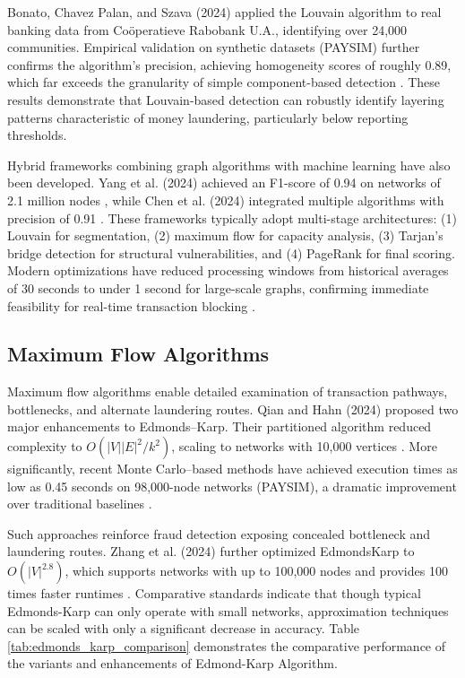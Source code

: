 \documentclass[lettersize,journal]{IEEEtran}
\begin{document}
Bonato, Chavez Palan, and Szava (2024) applied the Louvain algorithm to real banking data from Coöperatieve Rabobank U.A., identifying over 24,000 communities. Empirical validation on synthetic datasets (PAYSIM) further confirms the algorithm's precision, achieving homogeneity scores of roughly 0.89, which far exceeds the granularity of simple component-based detection \cite{bonato2024aml}. These results demonstrate that Louvain-based detection can robustly identify layering patterns characteristic of money laundering, particularly below reporting thresholds.

Hybrid frameworks combining graph algorithms with machine learning have also been developed. Yang et al. (2024) achieved an F1-score of 0.94 on networks of 2.1 million nodes \cite{yang2024gnn}, while Chen et al. (2024) integrated multiple algorithms with precision of 0.91 \cite{chen2024hybrid}. These frameworks typically adopt multi-stage architectures: (1) Louvain for segmentation, (2) maximum flow for capacity analysis, (3) Tarjan’s bridge detection for structural vulnerabilities, and (4) PageRank for final scoring. Modern optimizations have reduced processing windows from historical averages of 30 seconds to under 1 second for large-scale graphs, confirming immediate feasibility for real-time transaction blocking \cite{yang2024gnn,chen2024hybrid}.

\subsection{Maximum Flow Algorithms}

Maximum flow algorithms enable detailed examination of transaction pathways, bottlenecks, and alternate laundering routes. Qian and Hahn (2024) proposed two major enhancements to Edmonds–Karp. Their partitioned algorithm reduced complexity to $O(|V||E|^2/k^2)$, scaling to networks with 10,000 vertices \cite{qian2024partitioned}. More significantly, recent Monte Carlo–based methods have achieved execution times as low as 0.45 seconds on 98,000-node networks (PAYSIM), a dramatic improvement over traditional baselines \cite{qian2024montecarlo}.

Such approaches reinforce fraud detection exposing concealed bottleneck and laundering routes. Zhang et al. (2024) further optimized EdmondsKarp to $O(|V|^{2.8})$, which supports networks with up to 100,000 nodes and provides 100 times faster runtimes \cite{zhang2024flow}. Comparative standards indicate that though typical Edmonds-Karp can only operate with small networks, approximation techniques can be scaled with only a significant decrease in accuracy. Table \ref{tab:edmonds_karp_comparison} demonstrates the comparative performance of the variants and enhancements of Edmond-Karp Algorithm.
\end{document}
